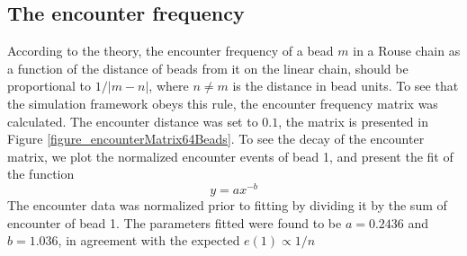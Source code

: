 \documentclass[12pt]{book}
\begin{document}
\subsection{The encounter frequency}
According to the theory, the encounter frequency of a bead $m$ in a Rouse chain as a function of the distance of beads from it on the linear chain, should be proportional to $1/|m-n|$, where $n\ne m$ is the distance in bead units. To see that the simulation framework obeys this rule, the encounter frequency matrix was calculated. The encounter distance was set to $0.1$, the matrix is presented in Figure \ref{figure_encounterMatrix64Beads}. To see the decay of the encounter matrix, we  plot the normalized encounter events of bead 1, and present the fit of the function
\begin{equation}
y = ax^{-b}
\end{equation}
The encounter data was normalized prior to fitting by dividing it by the sum of encounter of bead 1. The parameters fitted were found to be $a=0.2436$ and $b=1.036$, in agreement with the expected $e(1)\propto 1/n$
\end{document}
